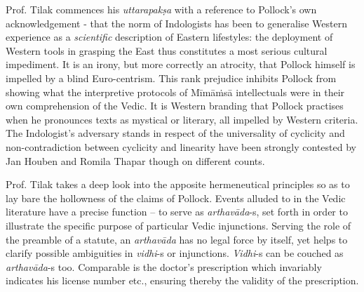 Prof. Tilak commences his \textit{uttarapakṣa} with a reference to Pollock’s own acknowledgement - that the norm of Indologists has been to generalise Western experience as a \textit{scientific} description of Eastern lifestyles: the deployment of Western tools in grasping the East thus constitutes a most serious cultural impediment. It is an irony, but more correctly an atrocity, that Pollock himself is impelled by a blind Euro-centrism. This rank prejudice inhibits Pollock from showing what the interpretive protocols of Mīmāṁsā intellectuals were in their own comprehension of the Vedic. It is Western branding that Pollock practises when he pronounces texts as mystical or literary, all impelled by Western criteria. The Indologist’s adversary stands in respect of the universality of cyclicity and non-contradiction between cyclicity and linearity have been strongly contested by Jan Houben and Romila Thapar though on different counts. 

Prof. Tilak takes a deep look into the apposite hermeneutical principles so as to lay bare the hollowness of the claims of Pollock. Events alluded to in the Vedic literature have a precise function – to serve as \textit{arthavāda}-s, set forth in order to illustrate the specific purpose of particular Vedic injunctions. Serving the role of the preamble of a statute, an \textit{arthavāda} has no legal force by itself, yet helps to clarify possible ambiguities in \textit{vidhi}-s or injunctions. \textit{Vidhi}-s can be couched as \textit{arthavāda}-s too. Comparable is the doctor’s prescription which invariably indicates his license number etc., ensuring thereby the validity of the prescription. 

